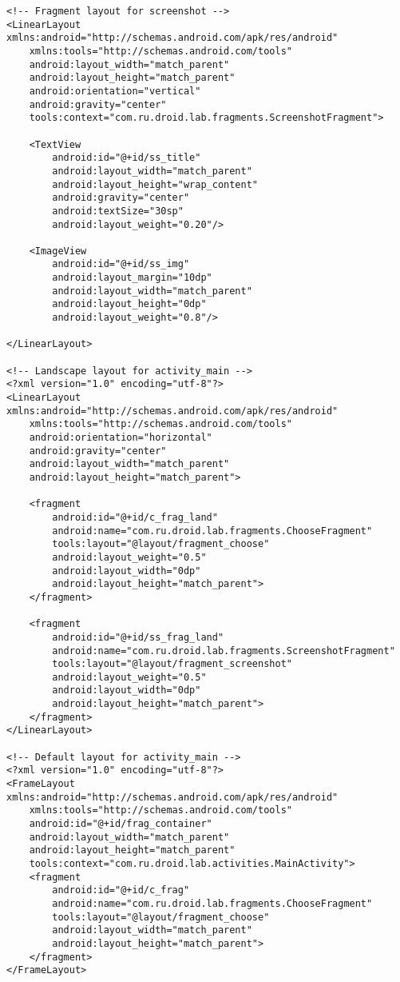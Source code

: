 \begin{lstlisting}[style=A_XML, caption={XML for fragment example}, label={listing:fragxml}]
<!-- Fragment layout for screenshot -->
<LinearLayout xmlns:android="http://schemas.android.com/apk/res/android"
    xmlns:tools="http://schemas.android.com/tools"
    android:layout_width="match_parent"
    android:layout_height="match_parent"
    android:orientation="vertical"
    android:gravity="center"
    tools:context="com.ru.droid.lab.fragments.ScreenshotFragment">

    <TextView
        android:id="@+id/ss_title"
        android:layout_width="match_parent"
        android:layout_height="wrap_content"
        android:gravity="center"
        android:textSize="30sp"
        android:layout_weight="0.20"/>

    <ImageView
        android:id="@+id/ss_img"
        android:layout_margin="10dp"
        android:layout_width="match_parent"
        android:layout_height="0dp"
        android:layout_weight="0.8"/>

</LinearLayout>

<!-- Landscape layout for activity_main -->
<?xml version="1.0" encoding="utf-8"?>
<LinearLayout xmlns:android="http://schemas.android.com/apk/res/android"
    xmlns:tools="http://schemas.android.com/tools"
    android:orientation="horizontal"
    android:gravity="center"
    android:layout_width="match_parent"
    android:layout_height="match_parent">

    <fragment
        android:id="@+id/c_frag_land"
        android:name="com.ru.droid.lab.fragments.ChooseFragment"
        tools:layout="@layout/fragment_choose"
        android:layout_weight="0.5"
        android:layout_width="0dp"
        android:layout_height="match_parent">
    </fragment>

    <fragment
        android:id="@+id/ss_frag_land"
        android:name="com.ru.droid.lab.fragments.ScreenshotFragment"
        tools:layout="@layout/fragment_screenshot"
        android:layout_weight="0.5"
        android:layout_width="0dp"
        android:layout_height="match_parent">
    </fragment>
</LinearLayout>

<!-- Default layout for activity_main -->
<?xml version="1.0" encoding="utf-8"?>
<FrameLayout xmlns:android="http://schemas.android.com/apk/res/android"
    xmlns:tools="http://schemas.android.com/tools"
    android:id="@+id/frag_container"
    android:layout_width="match_parent"
    android:layout_height="match_parent"
    tools:context="com.ru.droid.lab.activities.MainActivity">
    <fragment
        android:id="@+id/c_frag"
        android:name="com.ru.droid.lab.fragments.ChooseFragment"
        tools:layout="@layout/fragment_choose"
        android:layout_width="match_parent"
        android:layout_height="match_parent">
    </fragment>
</FrameLayout>


\end{lstlisting}
